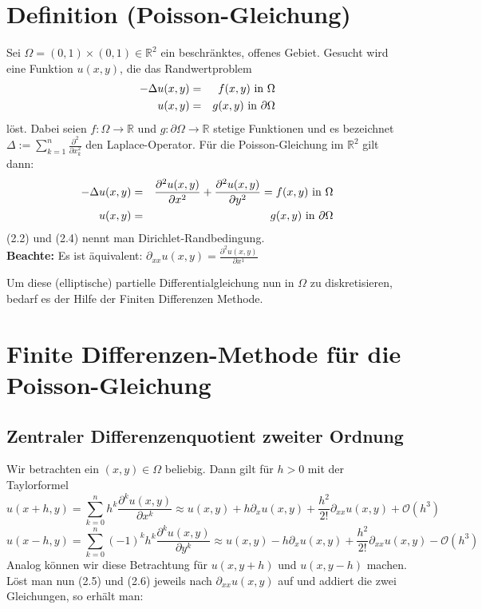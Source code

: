 \section{Definition (Poisson-Gleichung)}\label{s.Poisson-Gleichung}

Sei $\Omega = (0,1)\times(0,1) \in \mathbb{R}^{2}$ ein beschränktes, offenes Gebiet. Gesucht wird eine Funktion $u(x,y)$, die das Randwertproblem
\begin{eqnarray}
        -\Delta u(x,y) &=& f(x,y) \textnormal{ in } \Omega \\
    u(x,y) &=& g(x,y) \textnormal{ in } \partial \Omega
\end{eqnarray}
löst.
Dabei seien $f: \Omega \rightarrow \mathbb{R}$ und $g: \partial\Omega \rightarrow \mathbb{R}$ stetige Funktionen und es bezeichnet $\Delta := \sum\limits_{k=1}^{n} \frac {\partial^{2}} {\partial x_{k}^{2}}$ den Laplace-Operator. Für die Poisson-Gleichung im $\mathbb{R}^{2}$ gilt dann:
\begin{eqnarray}
        -\Delta u(x,y) &=& \frac {\partial^{2} u(x,y)} {\partial x^{2}} + \frac {\partial^{2} u(x,y)} {\partial y^{2}} = f(x,y) \textnormal{ in } \Omega \\
    u(x,y) &=& g(x,y) \textnormal{ in } \partial \Omega
\end{eqnarray}
(2.2) und (2.4) nennt man Dirichlet-Randbedingung.\\
\textbf{Beachte:} Es ist äquivalent: $\partial_{xx}u(x,y) = \frac {\partial^{2}u(x,y)} {\partial x^{1}}$

Um diese (elliptische) partielle Differentialgleichung nun in $\Omega$ zu diskretisieren, bedarf es der Hilfe der Finiten Differenzen Methode.

\section{Finite Differenzen-Methode für die Poisson-Gleichung}\label{s.Finite Differenzen}

\subsection{Zentraler Differenzenquotient zweiter Ordnung}\label{ss.Differenzenquotient zweiter Ordnung}

Wir betrachten ein $(x,y) \in \Omega$ beliebig. Dann gilt für $h > 0$ mit der Taylorformel
\begin{equation}
u(x+h,y) = \sum_{k = 0}^{n} h^{k} \frac {\partial^{k}u(x,y)} {\partial x^{k}} \approx u(x,y) + h \partial_{x} u(x,y) + \frac {h^{2}} {2!} \partial_{xx} u(x,y) + \mathcal{O}(h^{3})
\end{equation}
\begin{equation}
u(x-h,y) = \sum_{k = 0}^{n} (-1)^{k} h^{k} \frac {\partial^{k}u(x,y)} {\partial y^{k}} \approx u(x,y) - h \partial_{x} u(x,y) + \frac {h^{2}} {2!} \partial_{xx} u(x,y) - \mathcal{O}(h^{3})
\end{equation}
Analog können wir diese Betrachtung für $u(x,y+h)$ und $u(x,y-h)$ machen. \\
Löst man nun (2.5) und (2.6) jeweils nach $\partial_{xx} u(x,y)$ auf und addiert die zwei Gleichungen, so erhält man:

